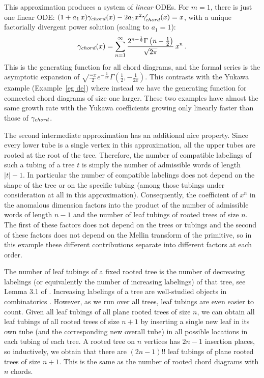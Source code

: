 \documentclass[oneside]{amsart}
\theoremstyle{definition}
\begin{document}
This approximation produces a system of {\it linear} ODEs. For $m=1$, there is just one linear ODE: $(1+a_1\, x)\gamma_{\rm chord}(x)-2a_1 x^2 \gamma_{\rm chord}^\prime(x)=x$, with a unique factorially divergent power solution (scaling to $a_1=1$):
\begin{eqnarray} \gamma_{\rm chord}(x)  = \sum_{n=1}^\infty \frac{2^{n-\frac{1}{2}}\Gamma\left(n-\frac{1}{2}\right)}{\sqrt{2\pi}}\, x^{n}\,. \label{eq:approx2b} \end{eqnarray}
This is the generating function for all chord diagrams, and the formal series is the asymptotic expansion of $\sqrt{\frac{-x}{2}}e^{-\frac{1}{2x}}\Gamma\left(\frac{1}{2}, -\frac{1}{2x}\right)$.  This contrasts with the Yukawa example (Example~\ref{eg de}) where instead we have the generating function for connected chord diagrams of size one larger.  These two examples have almost the same growth rate with the Yukawa coefficients growing only linearly faster than those of $\gamma_{\rm chord}$.

%

The second intermediate approximation has an additional nice property.  Since every lower tube is a single vertex in this approximation, all the upper tubes are rooted at the root of the tree.  Therefore, the number of compatible labelings of such a tubing of a tree $t$ is simply the number of admissible words of length $|t|-1$. In particular the number of compatible labelings does not depend on the shape of the tree or on the specific tubing (among those tubings under consideration at all in this approximation).  Consequently, the coefficient of $x^{n}$ in the anomalous dimension factors into the product of the number of admissible words of length $n-1$ and the number of leaf tubings of rooted trees of size $n$.  The first of these factors does not depend on the trees or tubings and the second of these factors does not depend on the Mellin transform of the primitive, so in this example these different contributions separate into different factors at each order.

The number of leaf tubings of a fixed rooted tree is the number of decreasing labelings (or equivalently the number of increasing labelings) of that tree, see Lemma 3.1 of \cite{BCEFNOHY}.  Increasing labelings of a tree are well-studied objects in combinatorics \cite{bergeron_varieties_1992}.  However, as we run over all trees, leaf tubings are even easier to count.  Given all leaf tubings of all plane rooted trees of size $n$, we can obtain all leaf tubings of all rooted trees of size $n+1$ by inserting a single new leaf in its own tube (and the corresponding new overall tube) in all possible locations in each tubing of each tree.  A rooted tree on $n$ vertices has $2n-1$ insertion places, so inductively, we obtain that there are $(2n-1)!!$ leaf tubings of plane rooted trees of size $n+1$.  This is the same as the number of rooted chord diagrams with $n$ chords.
%
\end{document}
